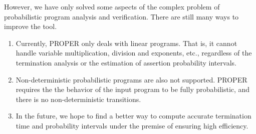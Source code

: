 \documentclass[runningheads]{llncs}
\begin{document}
However, we have only solved some aspects of the complex problem of probabilistic program analysis and verification. There are still many ways to improve the tool.
\begin{enumerate}
	\item Currently, PROPER only deals with linear programs. That is, it cannot handle variable multiplication, division and exponents, etc., regardless of the termination analysis or the estimation of assertion probability intervals.
	\item Non-deterministic probabilistic programs  are also not supported. PROPER requires the the behavior of the input program to be fully probabilistic, and there is no non-deterministic transitions. 
	\item In the future, we hope to find a better way to compute accurate termination time and probability intervals under the premise of ensuring high efficiency. 
\end{enumerate}
\end{document}
